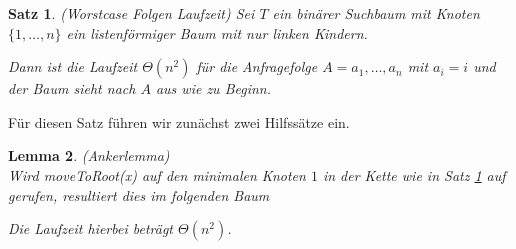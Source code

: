 \documentclass[11pt,a4paper,ngerman]{article}
\newtheorem{propo}{Satz}
\newtheorem{lemmas}[propo]{Lemma}
\begin{document}
\begin{propo}\label{ads:ueb2:mtrheu} (Worstcase Folgen Laufzeit)
   Sei $T$ ein binärer Suchbaum mit Knoten $\{1, \ldots, n\}$ 
   ein listenförmiger Baum mit nur linken Kindern. 

   \begin{center}
   \end{center}

   Dann 
   ist die Laufzeit $\Theta(n^2)$ für die Anfragefolge $A = a_1, \ldots, a_n$ mit $a_i = i$ und der Baum sieht nach $A$ aus wie zu Beginn.
\end{propo}

Für diesen Satz führen wir zunächst zwei Hilfssätze ein.

\begin{lemmas} \label{ads:ueb2:lemma1} (Ankerlemma)\\
   Wird \emph{moveToRoot(x)} auf den minimalen Knoten $1$ in der Kette wie in Satz \ref{ads:ueb2:mtrheu} auf gerufen,  resultiert dies im 
   folgenden Baum

   \begin{center}
   \end{center}

   Die Laufzeit hierbei beträgt $\Theta(n^2)$.
\end{lemmas}
\end{document}
